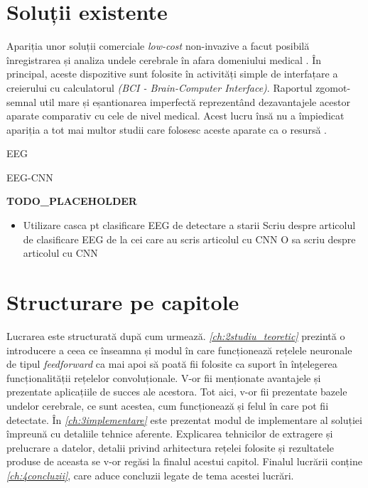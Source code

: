 \section{Soluții existente}
Apariția unor soluții comerciale \textit{low-cost} non-invazive a facut posibilă înregistrarea și analiza undele cerebrale în afara domeniului medical \cite{online:emotiv}. În principal, aceste dispozitive sunt folosite în activități simple de interfațare a creierului cu calculatorul \textit{(BCI - Brain-Computer Interface)}. Raportul zgomot-semnal util mare și eșantionarea imperfectă reprezentând dezavantajele acestor aparate comparativ cu cele de nivel medical. Acest lucru însă nu a împiedicat apariția a tot mai multor studii care folosesc aceste aparate ca o resursă \cite{consumer-eeg:2018}.



EEG\cite{eeg:2018}

EEG-CNN\cite{eeg-cnn:2020}

\textbf{TODO\_PLACEHOLDER}
\begin{itemize}
	\item Utilizare casca pt clasificare EEG de detectare a starii
	\subitem Scriu despre articolul de clasificare EEG de la cei care au scris articolul cu CNN
	\subitem O sa scriu despre articolul cu CNN
\end{itemize}
\section{Structurare pe capitole}
Lucrarea este structurată după cum urmează. \textit{\autoref{ch:2studiu_teoretic}} prezintă o introducere a ceea ce înseamna și modul în care funcționează rețelele neuronale de tipul \textit{feedforward} ca mai apoi să poată fii folosite ca suport în înțelegerea funcționalității rețelelor convoluționale. V-or fii menționate avantajele și prezentate aplicațiile de succes ale acestora. Tot aici, v-or fii prezentate bazele undelor cerebrale, ce sunt acestea, cum funcționează și felul în care pot fii detectate. În \textit{\autoref{ch:3implementare}} este prezentat modul de implementare al soluției împreună cu detaliile tehnice aferente. Explicarea tehnicilor de extragere și prelucrare a datelor, detalii privind arhitectura rețelei folosite și rezultatele produse de aceasta se v-or regăsi la finalul acestui capitol. Finalul lucrării conține \textit{\autoref{ch:4concluzii}}, care aduce concluzii legate de tema acestei lucrări.